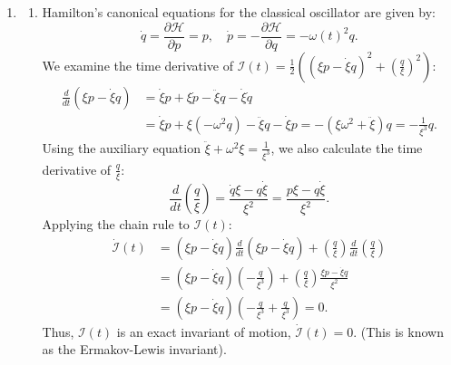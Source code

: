 \documentclass{article}
\begin{document}
\begin{enumerate}[label=\fbox{\arabic*}]
  \item %
        \begin{enumerate}[label=(\roman*)]
          \item Hamilton's canonical equations for the classical oscillator are given by:
          \[
            \dot{q} = \frac{\partial \mathcal{H}}{\partial p} = p, \quad \dot{p} = -\frac{\partial \mathcal{H}}{\partial q} = -\omega(t)^2 q.
          \]
          We examine the time derivative of $\mathcal{I}(t) = \frac{1}{2} \left( (\xi p - \dot{\xi} q)^2 + \left( \frac{q}{\xi} \right)^2 \right)$:
          \begin{align*}
            \frac{d}{dt} \left( \xi p - \dot{\xi} q \right) &= \dot{\xi} p + \xi \dot{p} - \ddot{\xi} q - \dot{\xi} \dot{q} \\
            &= \dot{\xi} p + \xi (-\omega^2 q) - \ddot{\xi} q - \dot{\xi} p = -(\xi \omega^2 + \ddot{\xi}) q = -\frac{1}{\xi^3} q.
          \end{align*}
          Using the auxiliary equation $\ddot{\xi} + \omega^2 \xi = \frac{1}{\xi^3}$, we also calculate the time derivative of $\frac{q}{\xi}$:
          \[
            \frac{d}{dt} \left( \frac{q}{\xi} \right) = \frac{\dot{q} \xi - q \dot{\xi}}{\xi^2} = \frac{p \xi - q \dot{\xi}}{\xi^2}.
          \]
          Applying the chain rule to $\mathcal{I}(t)$:
          \begin{align*}
            \dot{\mathcal{I}}(t) &= (\xi p - \dot{\xi} q) \frac{d}{dt} (\xi p - \dot{\xi} q) + \left(\frac{q}{\xi}\right) \frac{d}{dt} \left(\frac{q}{\xi}\right) \\
            &= (\xi p - \dot{\xi} q) \left( -\frac{q}{\xi^3} \right) + \left(\frac{q}{\xi}\right) \frac{\xi p - \dot{\xi} q}{\xi^2} \\
            &= (\xi p - \dot{\xi} q) \left( -\frac{q}{\xi^3} + \frac{q}{\xi^3} \right) = 0.
          \end{align*}
          Thus, $\mathcal{I}(t)$ is an exact invariant of motion, $\dot{\mathcal{I}}(t) = 0$. (This is known as the Ermakov-Lewis invariant).


\end{enumerate}
\end{enumerate}
\end{document}
